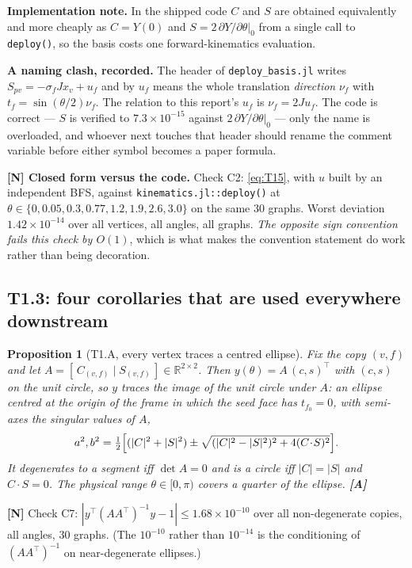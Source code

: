 \documentclass[11pt,a4paper]{article}
\newtheorem{proposition}[theorem]{Proposition}
\theoremstyle{definition}
\newcommand{\file}[1]{\texttt{\small #1}}
\begin{document}
\textbf{Implementation note.} In the shipped code $C$ and $S$ are obtained equivalently and
more cheaply as $C=Y(0)$ and $S=2\,\partial Y/\partial\theta|_{0}$ from a single call to
\file{deploy()}, so the basis costs one forward-kinematics evaluation.

\textbf{A naming clash, recorded.} The header of \file{deploy\_basis.jl} writes
$S_{pv}=-\sigma_fJx_v+u_f$ and by $u_f$ means the whole translation \emph{direction}
$\nu_f$ with $t_f=\sin(\theta/2)\nu_f$. The relation to this report's $u_f$ is
$\nu_f=2Ju_f$. The code is correct --- $S$ is verified to $7.3\times10^{-15}$ against
$2\,\partial Y/\partial\theta|_0$ --- only the name is overloaded, and whoever next touches
that header should rename the comment variable before either symbol becomes a paper formula.

\textbf{[N] Closed form versus the code.} Check C2: \eqref{eq:T15}, with $u$ built by an
independent BFS, against \file{kinematics.jl::deploy()} at
$\theta\in\{0,0.05,0.3,0.77,1.2,1.9,2.6,3.0\}$ on the same 30 graphs. Worst deviation
$1.42\times10^{-14}$ over all vertices, all angles, all graphs. \emph{The opposite sign
convention fails this check by $O(1)$}, which is what makes the convention statement do work
rather than being decoration.

\subsection{T1.3: four corollaries that are used everywhere downstream}

\begin{proposition}[T1.A, every vertex traces a centred ellipse]
Fix the copy $(v,f)$ and let $A=[\,C_{(v,f)}\mid S_{(v,f)}\,]\in\mathbb{R}^{2\times2}$. Then
$y(\theta)=A\,(c,s)^{\!\top}$ with $(c,s)$ on the unit circle, so $y$ traces the image of the
unit circle under $A$: an ellipse centred at the origin of the frame in which the seed face
has $t_{f_0}=0$, with semi-axes the singular values of $A$,
\[
a^2,b^2 = \tfrac12\Bigl[(|C|^2+|S|^2) \pm \sqrt{(|C|^2-|S|^2)^2+4(C\!\cdot\!S)^2}\Bigr].
\]
It degenerates to a segment iff $\det A=0$ and is a circle iff $|C|=|S|$ and $C\!\cdot\!S=0$.
The physical range $\theta\in[0,\pi)$ covers a quarter of the ellipse. \textbf{[A]}
\end{proposition}
\noindent\textbf{[N]} Check C7: $|y^{\!\top}(AA^{\!\top})^{-1}y-1|\le1.68\times10^{-10}$ over
all non-degenerate copies, all angles, 30 graphs. (The $10^{-10}$ rather than $10^{-14}$ is
the conditioning of $(AA^{\!\top})^{-1}$ on near-degenerate ellipses.)
\end{document}
